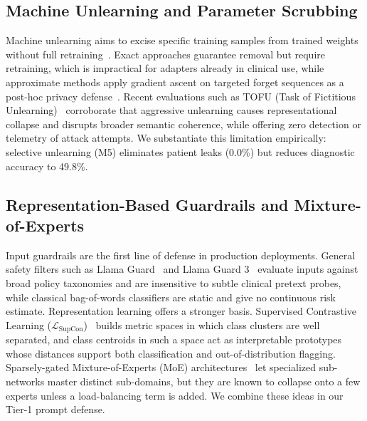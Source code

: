 \documentclass[lettersize,journal]{IEEEtran}
\begin{document}
\subsection{Machine Unlearning and Parameter Scrubbing}
Machine unlearning aims to excise specific training samples from trained weights without full retraining~\cite{bourtoule2021}. Exact approaches guarantee removal but require retraining, which is impractical for adapters already in clinical use, while approximate methods apply gradient ascent on targeted forget sequences as a post-hoc privacy defense~\cite{golatkar2020}. Recent evaluations such as TOFU (Task of Fictitious Unlearning)~\cite{maini2024} corroborate that aggressive unlearning causes representational collapse and disrupts broader semantic coherence, while offering zero detection or telemetry of attack attempts. We substantiate this limitation empirically: selective unlearning (M5) eliminates patient leaks (0.0\%) but reduces diagnostic accuracy to 49.8\%.

\subsection{Representation-Based Guardrails and Mixture-of-Experts}
Input guardrails are the first line of defense in production deployments. General safety filters such as Llama Guard~\cite{inan2023} and Llama Guard 3~\cite{inan2024llamaguard3} evaluate inputs against broad policy taxonomies and are insensitive to subtle clinical pretext probes, while classical bag-of-words classifiers are static and give no continuous risk estimate. Representation learning offers a stronger basis. Supervised Contrastive Learning ($\mathcal{L}_{\mathrm{SupCon}}$)~\cite{khosla2020} builds metric spaces in which class clusters are well separated, and class centroids in such a space act as interpretable prototypes~\cite{snell2017} whose distances support both classification and out-of-distribution flagging. Sparsely-gated Mixture-of-Experts (MoE) architectures~\cite{shazeer2017, fedus2022} let specialized sub-networks master distinct sub-domains, but they are known to collapse onto a few experts unless a load-balancing term is added. We combine these ideas in our Tier-1 prompt defense.
\end{document}
